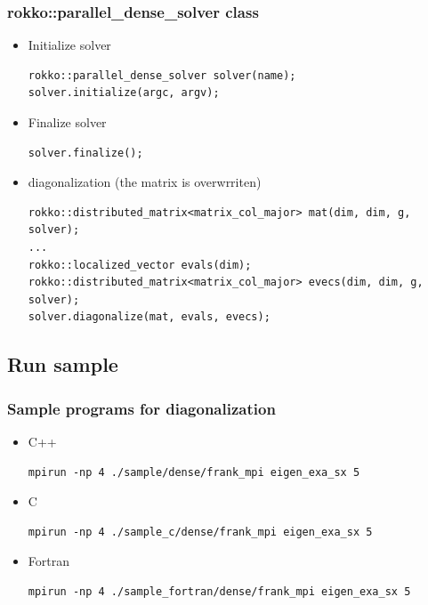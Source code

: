\begin{frame}[c,fragile]
  \frametitle{rokko::parallel\_dense\_solver class}
  \begin{itemize}
  \item Initialize solver
\begin{lstlisting}
rokko::parallel_dense_solver solver(name);
solver.initialize(argc, argv);
\end{lstlisting}
  \item Finalize solver
\begin{lstlisting}
solver.finalize();
\end{lstlisting}
  \item diagonalization (the matrix is overwrriten)
\begin{lstlisting}
rokko::distributed_matrix<matrix_col_major> mat(dim, dim, g, solver);
...
rokko::localized_vector evals(dim);
rokko::distributed_matrix<matrix_col_major> evecs(dim, dim, g, solver);
solver.diagonalize(mat, evals, evecs);
\end{lstlisting}
  \end{itemize}
\end{frame}

\subsection{Run sample}

\begin{frame}[c,fragile]
  \frametitle{Sample programs for diagonalization}
  \begin{itemize}
  \item C++ 
\begin{lstlisting}[style=shstyle]
mpirun -np 4 ./sample/dense/frank_mpi eigen_exa_sx 5
\end{lstlisting}
  \item C 
\begin{lstlisting}[style=shstyle]
mpirun -np 4 ./sample_c/dense/frank_mpi eigen_exa_sx 5
\end{lstlisting}
  \item Fortran 
\begin{lstlisting}[style=shstyle]
mpirun -np 4 ./sample_fortran/dense/frank_mpi eigen_exa_sx 5
\end{lstlisting}

  \end{itemize}
\end{frame}

